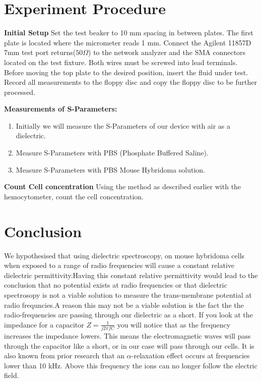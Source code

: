 \documentclass[journal]{IEEEtran}
\begin{document}
\section{Experiment Procedure}

\textbf{Initial Setup}
Set the test beaker to 10 mm spacing in between plates. The first plate is located where the micrometer reads 1 mm. Connect the Agilent 11857D 7mm test port returns($50\Omega$) to the network analyzer and the SMA connectors located on the test fixture. Both wires must be screwed into lead terminals. Before moving the top plate to the desired position, insert the fluid under test. Record all measurements to the floppy disc and copy the floppy disc to be further processed. 

\textbf{Measurements of S-Parameters:}
\begin{enumerate}
	\item Initially we will measure the S-Parameters of our device with air as a dielectric.
	\item Measure S-Parameters with PBS (Phosphate Buffered Saline).
	\item Measure S-Parameters with PBS Mouse Hybridoma solution.
\end{enumerate}

\textbf{Count Cell concentration}
Using the method as described earlier with the hemocytometer, count the cell concentration.

\section{Conclusion}
We hypothesised that using dielectric spectroscopy, on mouse hybridoma cells when exposed to a range of radio frequencies will cause a constant relative dielectric permittivity.Having this constant relative permittivity would lead to the conclusion that no potential exists at radio frequencies or that dielectric spectrosopy is not a viable solution to measure the trans-membrane potential at radio frequncies.A reason this may not be a viable solution is the fact the the radio-frequencies are passing through our dielectric as a short. If you look at the impedance for a capacitor $Z = \frac{1}{j2\pi f C}$ you will notice that as the frequency increases the impedance lowers. This means the electromagnetic waves will pass through the capacitor like a short, or in our case will pass through our cells. It is also known from prior research that an $\alpha$-relaxation effect occurs at frequencies lower than 10 kHz. Above this frequency the ions can no longer follow the electric field.
\end{document}
